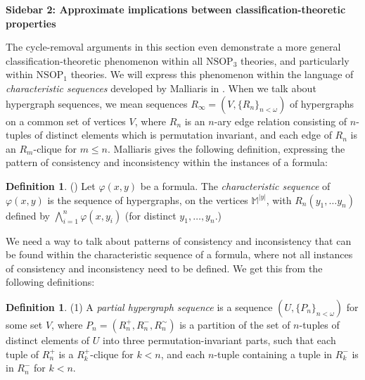 \documentclass{amsart}
\theoremstyle{definition}
\newtheorem{definition}[theorem]{Definition}
\theoremstyle{remark}
\numberwithin{equation}{section}
\begin{document}
\begin{tcolorbox}[
    enhanced,
    breakable,
    oversize,                 %
    colback=blue!5!white,     %
    colframe=blue!75!black,   %
    skin first=enhanced,      %
    skin middle=enhanced,     %
    skin last=enhanced        %
]

\textsf{\textbf{Sidebar 2: Approximate implications between classification-theoretic properties}}

\:

\: The cycle-removal arguments in this section even demonstrate a more general classification-theoretic phenomenon within all $\mathrm{NSOP}_{3}$ theories, and particularly within $\mathrm{NSOP}_1$ theories. We will express this phenomenon within the language of \textit{characteristic sequences} developed by Malliaris in \cite{Mal10}. When we talk about hypergraph sequences, we mean sequences $R_{\infty}=(V,\{R_{n}\}_{n < \omega})$ of hypergraphs on a common set of vertices $V$, where $R_{n}$ is an $n$-ary edge relation consisting of $n$-tuples of distinct elements which is permutation invariant, and each edge of $R_{n}$ is an $R_{m}$-clique for $m \leq n$. Malliaris gives the following definition, expressing the pattern of consistency and inconsistency within the instances of a formula:


\begin{definition}(\cite{Mal10})
   Let $\varphi(x, y)$ be a formula. The \emph{characteristic sequence} of $\varphi(x, y)$ is the sequence of hypergraphs, on the vertices $\mathbb{M}^{|y|}$, with $R_{n}(y_{1}, \ldots y_{n})$ defined by $\bigwedge_{i=1}^{n}\varphi(x, y_{i})$ (for distinct $y_{1}, \ldots, y_{n}$.)
\end{definition}


\: We need a way to talk about patterns of consistency and inconsistency that can be found within the characteristic sequence of a formula, where not all instances of consistency and inconsistency need to be defined. We  get this from the following definitions:

\begin{definition}
(1) A \textit{partial hypergraph sequence} is a sequence $(U, \{P_{n}\}_{n < \omega})$ for some set $V$, where $P_{n}=( R^{+}_{n} ,R_{n}^{-} ,R_{n}^{\sim})$ is a partition of the set of $n$-tuples of distinct elements of $U$ into three permutation-invariant parts, such that each tuple of $R^{+}_{n} $ is a $R_{k}^{+}$-clique for $k < n$, and each $n$-tuple containing a tuple in $R_{k}^{-}$ is in $R_{n}^{-}$ for $k <n$.


\end{definition}
\end{tcolorbox}
\end{document}
